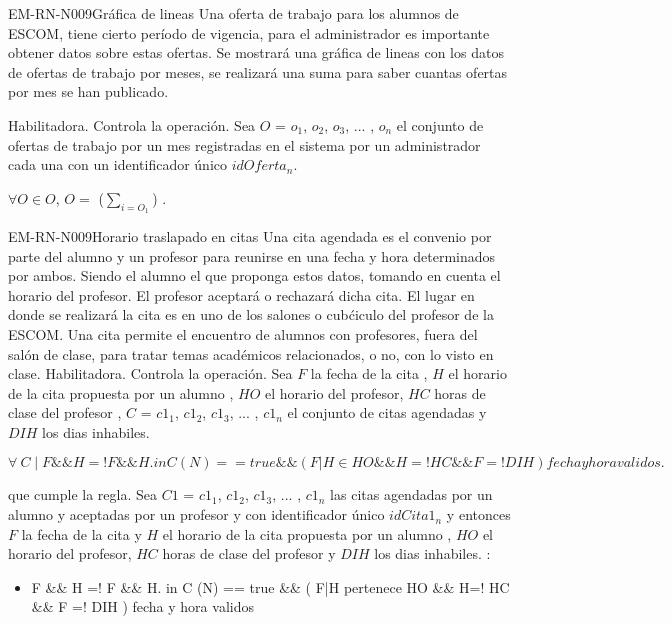 \begin{BussinesRule}{EM-RN-N009}{Gráfica de lineas}
	\BRitem[Descripción:] 
	Una oferta de trabajo para los alumnos de ESCOM, tiene cierto período de vigencia, para el administrador es importante obtener datos sobre estas ofertas.
	Se mostrará una gráfica de lineas con los datos de ofertas de trabajo por meses, se realizará una suma para saber cuantas ofertas por mes se han publicado.
	
	\BRitem[Tipo:] Habilitadora.
	\BRitem[Nivel:] Controla la operación.
	\BRitem[Sentencia: ] Sea $O$ = {$o_{1}$, $o_{2}$, $o_{3}$, ... , $o_{n}$} el conjunto de ofertas de trabajo por un mes registradas en el sistema por un administrador cada una con un 
	identificador único $idOferta_{n}$.
	\begin{center}
		$\forall O \in O$, $O=$ {($ \sum_{i=O_1} $)} .
	\end{center}
\end{BussinesRule}

\begin{BussinesRule}{EM-RN-N009}{Horario traslapado en citas}
	\BRitem[Descripción:] Una cita agendada es el convenio por parte del alumno y un profesor para reunirse
	en una fecha y hora determinados por ambos. Siendo el alumno el que proponga estos datos, tomando
	en cuenta el horario del profesor. El profesor aceptará o rechazará dicha cita.
	El lugar en donde se realizará la cita es en uno de los salones o cubćiculo del profesor de la ESCOM.
	Una cita permite el encuentro de alumnos con profesores, fuera del salón de clase, para tratar temas
	académicos relacionados, o no, con lo visto en clase.
	\BRitem[Tipo:] Habilitadora.
	\BRitem[Nivel:] Controla la operación.
	\BRitem[Sentencia: ] Sea $F$ la fecha de la cita , $H$ el horario de la cita propuesta por un alumno , $HO$ el horario del profesor, $HC$ horas de clase del profesor , $C$ = {$c1_{1}$, $c1_{2}$, $c1_{3}$, ... , $c1_{n}$} el conjunto de citas agendadas y $DIH$ los dias inhabiles.
	\begin{center}
		$\forall \: C \mid F \&\& H =! F \&\& H. in C (N) == true \&\& (F|H \in HO \&\& H=! HC \&\& F =! DIH ) fecha y hora validos.$

	\end{center}
	 que cumple la regla.
		Sea $C1$ = {$c1_{1}$, $c1_{2}$, $c1_{3}$, ... , $c1_{n}$} las citas agendadas por un alumno y
		aceptadas por un profesor y con identificador único $idCita1_{n}$ y  entonces $F$ la fecha de la cita y $H$ el horario de la cita propuesta por un alumno , $HO$ el horario del profesor, $HC$ horas de clase del profesor y $DIH$ los dias inhabiles. :
		\begin{itemize}
			\item  F \&\& H =! F \&\& H. in C (N) == true \&\& (
		F|H pertenece HO \&\& H=! HC \&\& F =! DIH ) fecha y hora validos
		\end{itemize}
\end{BussinesRule}


